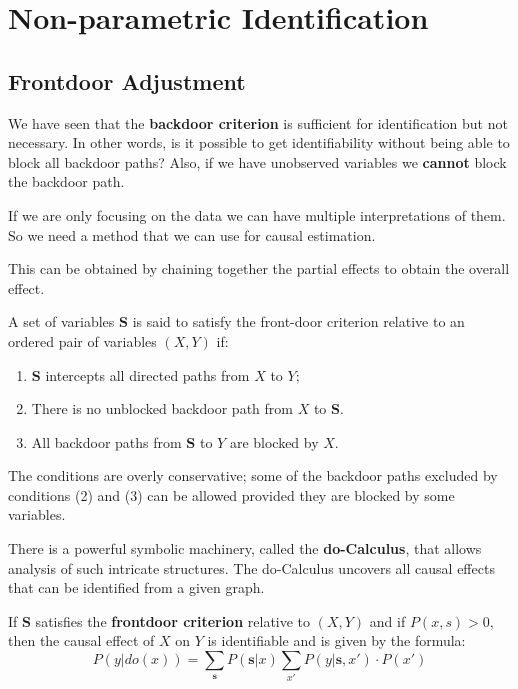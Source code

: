 \chapter{Non-parametric Identification}
\section{Frontdoor Adjustment}
We have seen that the \textbf{backdoor criterion} is sufficient for identification
but not necessary. In other words, is it possible to get identifiability without
being able to block all backdoor paths? Also, if we have unobserved variables we
\textbf{cannot} block the backdoor path.

If we are only focusing on the data we can have multiple interpretations of them.
So we need a method that we can use for causal estimation.

This can be obtained by chaining together the partial effects to obtain the overall effect.
\begin{definition}
    A set of variables $\mathbf{S}$ is said to satisfy the front-door criterion
    relative to an ordered pair of variables $(X, Y)$ if:
    \begin{enumerate}
        \item $\mathbf{S}$ intercepts all directed paths from $X$ to $Y$;
        \item There is no unblocked backdoor path from $X$ to $\mathbf{S}$.
        \item All backdoor paths from $\mathbf{S}$ to $Y$ are blocked by $X$.
    \end{enumerate}
\end{definition}
The conditions are overly conservative; some of the backdoor paths excluded by
conditions (2) and (3) can be allowed provided they are blocked by some
variables.

There is a powerful symbolic machinery, called the \textbf{do-Calculus}, that allows
analysis of such intricate structures. The do-Calculus uncovers all causal
effects that can be identified from a given graph.

\begin{definition}
    If $\mathbf{S}$ satisfies the \textbf{frontdoor criterion} relative to $(X, Y)$
    and if $P(x, s) > 0$, then the causal effect of $X$ on $Y$ is identifiable
    and is given by the formula:
    \begin{equation}
        P(y | do(x)) = \sum_{\mathbf{s}} P(\mathbf{s} | x) \sum_{x'} P(y | \mathbf{s}, x') \cdot P(x')
    \end{equation}
\end{definition}

